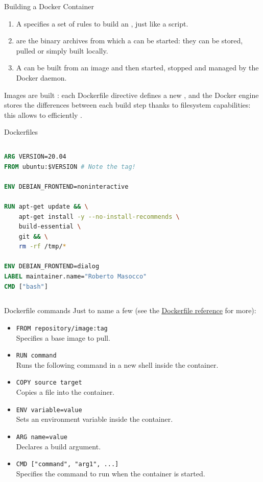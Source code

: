 \begin{frame}{Building a Docker Container}
\begin{enumerate}
  \item A  specifies a set of rules to build an , just like a script.
  \item {} are the binary archives from which a  can be started: they can be stored, pulled or simply built locally.
  \item A  can be built from an image and then started, stopped and managed by the Docker daemon.
\end{enumerate}
Images are built : each Dockerfile directive defines a new , and the Docker engine stores the differences between each build step thanks to filesystem capabilities: this allows to efficiently .
\end{frame}

\begin{frame}[fragile]{Dockerfiles}
\begin{columns}
\begin{lstlisting}[language=Dockerfile, caption=Minimal example of a Dockerfile running an Ubuntu image in a container]
ARG VERSION=20.04
FROM ubuntu:$VERSION # Note the tag!

ENV DEBIAN_FRONTEND=noninteractive

RUN apt-get update && \
    apt-get install -y --no-install-recommends \
    build-essential \
    git && \
    rm -rf /tmp/*

ENV DEBIAN_FRONTEND=dialog
LABEL maintainer.name="Roberto Masocco"
CMD ["bash"]
\end{lstlisting}
\end{columns}
\end{frame}
\begin{frame}{Dockerfile commands}
Just to name a few (see the \href{https://docs.docker.com/engine/reference/builder/}{\color{blue}\underline{Dockerfile reference}} for more):
\begin{itemize}
  \item \texttt{FROM repository/image:tag}\\Specifies a base image to pull.
  \item \texttt{RUN command}\\Runs the following command in a new shell inside the container.
  \item \texttt{COPY source target}\\Copies a file into the container.
  \item \texttt{ENV variable=value}\\Sets an environment variable inside the container.
  \item \texttt{ARG name=value}\\Declares a build argument.
  \item \texttt{CMD ["command", "arg1", ...]}\\Specifies the command to run when the container is started.
\end{itemize}
\end{frame}

